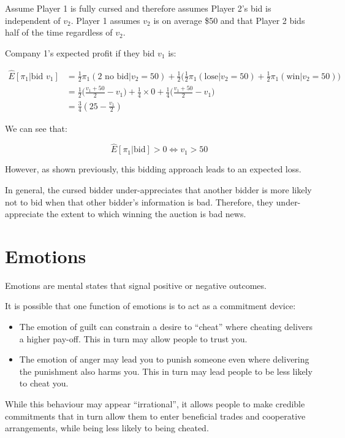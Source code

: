 \documentclass[
  letterpaper,
  DIV=11,
  numbers=noendperiod]{scrreprt}
\begin{document}
Assume Player 1 is fully cursed and therefore assumes Player 2's bid is
independent of \(v_2\). Player 1 assumes \(v_2\) is on average \$50 and
that Player 2 bids half of the time regardless of \(v_2\).

Company 1's expected profit if they bid \(v_1\) is:

\begin{align*}
\hat E[\pi_1|\text{bid }v_1]&=\frac{1}{2}\pi_1(2\text{ no bid}|v_2=50)+\frac{1}{2}\bigg(\frac{1}{2}\pi_1(\text{lose}|v_2=50)+\frac{1}{2}\pi_1(\text{win}|v_2=50)\bigg) \\
&=\frac{1}{2}\bigg(\frac{v_1+50}{2}-v_1\bigg)+\frac{1}{4}\times 0+\frac{1}{4}\bigg(\frac{v_1+50}{2}-v_1\bigg) \\
&=\frac{3}{4}(25-\frac{v_1}{2})
\end{align*}

We can see that:

\[
\hat E[\pi_1|\text{bid}]>0 \Leftrightarrow v_1>50
\]

However, as shown previously, this bidding approach leads to an expected
loss.

In general, the cursed bidder under-appreciates that another bidder is
more likely not to bid when that other bidder's information is bad.
Therefore, they under-appreciate the extent to which winning the auction
is bad news.

\hypertarget{emotions}{%
\chapter{Emotions}\label{emotions}}

Emotions are mental states that signal positive or negative outcomes.

It is possible that one function of emotions is to act as a commitment
device:

\begin{itemize}
\item
  The emotion of guilt can constrain a desire to ``cheat'' where
  cheating delivers a higher pay-off. This in turn may allow people to
  trust you.
\item
  The emotion of anger may lead you to punish someone even where
  delivering the punishment also harms you. This in turn may lead people
  to be less likely to cheat you.
\end{itemize}

While this behaviour may appear ``irrational'', it allows people to make
credible commitments that in turn allow them to enter beneficial trades
and cooperative arrangements, while being less likely to being cheated.
\end{document}

